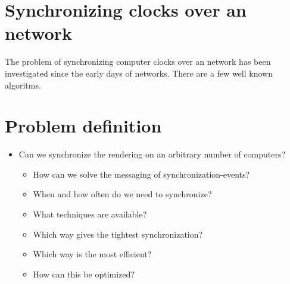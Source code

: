 \section{Synchronizing clocks over an network}
The problem of synchronizing computer clocks over an network has been investigated since the early days of networks. There are a few well known algoritms. 





\section{Problem definition}
\label{sec:problem_definition}

\begin{itemize}
  \item Can we synchronize the rendering on an arbitrary number of computers?
  \begin{itemize}
    \item How can we solve the messaging of synchronization-events?
  	\item When and how often do we need to synchronize?
    \item What techniques are available?
    \item Which way gives the tightest synchronization?
    \item Which way is the most efficient?
  	\item How can this be optimized?
  \end{itemize}
\end{itemize}
